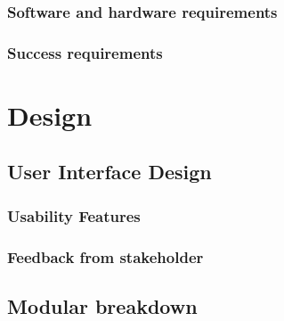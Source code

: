\documentclass[11pt,a4paper]{article}
\begin{document}
\pagebreak

\subsubsection{Software and hardware requirements}


\pagebreak

\subsubsection{Success requirements}


\section{Design}

\begin{comment}
design: for each page/screen:

picture of page


brief desc of what the page will do

for each one show the stakeholder requirements or success requirements that will be met when this page/feature is implmented;


then break down each component of the design page.
sentance or two on what it does and why (justify it being there)

\end{comment}

\subsection{User Interface Design}

\subsubsection{Usability Features}


\subsubsection{Feedback from stakeholder}

\subsection{Modular breakdown}

\end{document}
